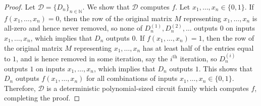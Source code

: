 \documentclass[letterpaper, reqno,11pt]{article}
\newcommand{\NN}{\mathbb{N}}
\begin{document}
\begin{enumerate}
\begin{proof}
    Let $\mathcal D = \{ D_n \}_{n \in \NN}$. We show that $\mathcal D$ computes $f$. Let $x_1, \ldots, x_n \in \{ 0, 1 \}$. If $f(x_1, \ldots, x_n) = 0$, then the row of the original matrix $M$ representing $x_1, \ldots, x_n$ is all-zero and hence never removed, so none of $D_n^{(1)}, D_n^{(2)}, \ldots$ outputs $0$ on inputs $x_1, \ldots, x_n$, which implies that $D_n$ outputs $0$. If $f(x_1, \ldots, x_n) = 1$, then the row of the original matrix $M$ representing $x_1, \ldots, x_n$ has at least half of the entries equal to $1$, and is hence removed in some iteration, say the $i^\text{th}$ iteration, so $D_n^{(i)}$ outputs $1$ on inputs $x_1, \ldots, x_n$, which implies that $D_n$ outputs $1$. This shows that $D_n$ outputs $f(x_1, \ldots, x_n)$ for all combinations of inputs $x_1, \ldots, x_n \in \{ 0, 1 \}$. Therefore, $\mathcal D$ is a deterministic polynomial-sized circuit family which computes $f$, completing the proof.
  \end{proof}
\end{enumerate}
\end{document}
